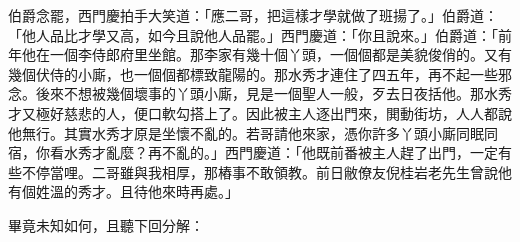 伯爵念罷，西門慶拍手大笑道：「應二哥，把這樣才學就做了班揚了。」伯爵道：「他人品比才學又高，如今且說他人品罷。」西門慶道：「你且說來。」伯爵道：「前年他在一個李侍郎府里坐館。那李家有幾十個丫頭，一個個都是美貌俊俏的。又有幾個伏侍的小廝，也一個個都標致龍陽的。那水秀才連住了四五年，再不起一些邪念。後來不想被幾個壞事的丫頭小廝，見是一個聖人一般，歹去日夜括他。那水秀才又極好慈悲的人，便口軟勾搭上了。因此被主人逐出門來，閧動街坊，人人都說他無行。其實水秀才原是坐懷不亂的。若哥請他來家，憑你許多丫頭小廝同眠同宿，你看水秀才亂麼？再不亂的。」西門慶道：「他既前番被主人趕了出門，一定有些不停當哩。二哥雖與我相厚，那樁事不敢領教。前日敝僚友倪桂岩老先生曾說他有個姓溫的秀才。且待他來時再處。」

畢竟未知如何，且聽下回分解：
